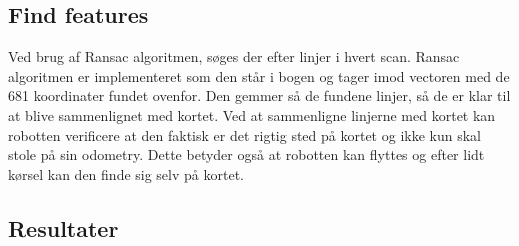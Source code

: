 \subsection{Find features}
Ved brug af Ransac algoritmen, søges der efter linjer i hvert scan. Ransac algoritmen er implementeret som den står i bogen og tager imod vectoren med de 681 koordinater fundet ovenfor. Den gemmer så de fundene linjer, så de er klar til at blive sammenlignet med kortet. Ved at sammenligne linjerne med kortet kan robotten verificere at den faktisk er det rigtig sted på kortet og ikke kun skal stole på sin odometry. Dette betyder også at robotten kan flyttes og efter lidt kørsel kan den finde sig selv på kortet.

\subsection{Resultater}